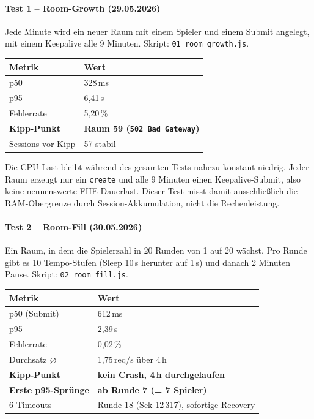 \paragraph{Test 1 -- Room-Growth (29.05.2026)}

Jede Minute wird ein neuer Raum mit einem Spieler und einem Submit angelegt, mit einem Keepalive alle 9 Minuten. Skript: \texttt{01\_room\_growth.js}.

\begin{table}[H]
\centering
\begin{tabular}{||l|l||}
    \hline
    \textbf{Metrik} & \textbf{Wert} \\
    \hline\hline
    p50 & 328\,ms \\
    \hline
    p95 & 6{,}41\,s \\
    \hline
    Fehlerrate & 5{,}20\,\% \\
    \hline
    \textbf{Kipp-Punkt} & \textbf{Raum 59 (\texttt{502 Bad Gateway})} \\
    \hline
    Sessions vor Kipp & 57 stabil \\
    \hline
\end{tabular}
\end{table}

Die CPU-Last bleibt während des gesamten Tests nahezu konstant niedrig. Jeder Raum erzeugt nur ein \texttt{create} und alle 9 Minuten einen Keepalive-Submit, also keine nennenswerte FHE-Dauerlast. Dieser Test misst damit ausschließlich die RAM-Obergrenze durch Session-Akkumulation, nicht die Rechenleistung.

\paragraph{Test 2 -- Room-Fill (30.05.2026)}

Ein Raum, in dem die Spielerzahl in 20 Runden von 1 auf 20 wächst. Pro Runde gibt es 10 Tempo-Stufen (Sleep 10\,s herunter auf 1\,s) und danach 2 Minuten Pause. Skript: \texttt{02\_room\_fill.js}.

\begin{table}[H]
\centering
\begin{tabular}{||l|l||}
    \hline
    \textbf{Metrik} & \textbf{Wert} \\
    \hline\hline
    p50 (Submit) & 612\,ms \\
    \hline
    p95 & 2{,}39\,s \\
    \hline
    Fehlerrate & 0{,}02\,\% \\
    \hline
    Durchsatz $\varnothing$ & 1{,}75\,req/s über 4\,h \\
    \hline
    \textbf{Kipp-Punkt} & \textbf{kein Crash, 4\,h durchgelaufen} \\
    \hline
    \textbf{Erste p95-Sprünge} & \textbf{ab Runde 7 (= 7 Spieler)} \\
    \hline
    6 Timeouts & Runde 18 (Sek 12\,317), sofortige Recovery \\
    \hline
\end{tabular}
\end{table}

